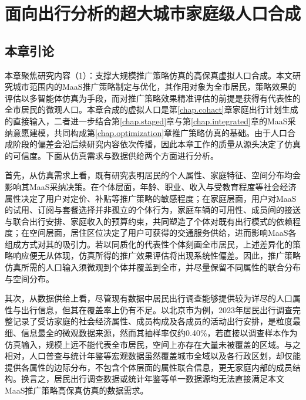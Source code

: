  \setlength{\baselineskip}{20pt}
\chapter{面向出行分析的超大城市家庭级人口合成}\label{chap.popsyn}


\section{本章引论}\label{sec.popsyn.intro}

本章聚焦研究内容（1）：支撑大规模推广策略仿真的高保真虚拟人口合成。本文研究城市范围内的MaaS推广策略制定与优化，其作用对象为全市居民，策略效果的评估以多智能体仿真为手段，而对推广策略效果精准评估的前提是获得有代表性的全市居民的微观人口。本章合成的虚拟人口是第\ref{chap.cohact}章家庭出行计划生成的直接输入，二者进一步结合第\ref{chap.staged}章与第\ref{chap.integrated}章的MaaS采纳意愿建模，共同构成第\ref{chap.optimization}章推广策略仿真的基础。由于人口合成阶段的偏差会沿后续研究内容依次传播，因此本章工作的质量从源头决定了仿真的可信度。下面从仿真需求与数据供给两个方面进行分析。


 
首先，从仿真需求上看，既有研究表明居民的个人属性、家庭特征、空间分布均会影响其MaaS采纳决策。在个体层面，年龄、职业、收入与受教育程度等社会经济属性决定了用户对定价、补贴等推广策略的敏感程度；在家庭层面，用户对MaaS的试用、订阅与套餐选择并非孤立的个体行为，家庭车辆的可用性、成员间的接送与联合出行安排、家庭收入的预算约束，共同塑造了个体对既有出行模式的依赖程度；在空间层面，居住区位决定了用户可获得的交通服务供给，进而影响MaaS各组成方式对其的吸引力。若以同质化的代表性个体刻画全市居民，上述差异化的策略响应便无从体现，仿真所得的推广效果评估将出现系统性偏差。因此，推广策略仿真所需的人口输入须微观到个体并覆盖到全市，并尽量保留不同属性的联合分布与空间分布。
 
其次，从数据供给上看，尽管现有数据中居民出行调查能够提供较为详尽的人口属性与出行信息，但其在覆盖率上仍有不足。以北京市为例，2023年居民出行调查完整记录了受访家庭的社会经济属性、成员构成及各成员的活动出行安排，是粒度最细、信息最全的微观数据来源，然而其抽样率仅约0.40\%，若直接以调查样本作为仿真输入，规模上远不能代表全市居民，空间上亦存在大量未被覆盖的区域。与之相对，人口普查与统计年鉴等宏观数据虽然覆盖城市全域以及各行政区划，却仅能提供各属性的边际分布，不包含个体层面的属性联合信息，更无家庭内部的成员结构。换言之，居民出行调查数据或统计年鉴等单一数据源均无法直接满足本文MaaS推广策略高保真仿真的数据需求。
 
